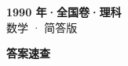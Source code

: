 \documentclass[zihao=-4, a4paper]{ctexart}
\begin{document}
\begin{center}
  {\Large\bfseries 1990 年·全国卷·理科}\\[4pt]
  {\large 数学 · 简答版}
\end{center}
\medskip
{}

\clearpage
{}
\begin{center}{\Large\bfseries 答案速查}\end{center}
\medskip

\end{document}
